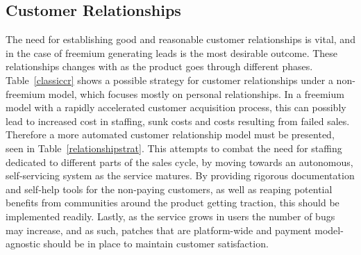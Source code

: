 \subsection{Customer Relationships}
The need for establishing good and reasonable customer relationships is vital, and in the case of freemium generating leads is the most desirable outcome. These relationships changes with as the product goes through different phases. Table~\ref{classiccr} shows a possible strategy for customer relationships under a non-freemium model, which focuses mostly on personal relationships. In a freemium model with a rapidly accelerated customer acquisition process, this can possibly lead to increased cost in staffing, sunk costs and costs resulting from failed sales. Therefore a more automated customer relationship model must be presented, seen in Table~\ref{relationshipstrat}. This attempts to combat the need for staffing dedicated to different parts of the sales cycle, by moving towards an autonomous, self-servicing system as the service matures. By providing rigorous documentation and self-help tools for the non-paying customers, as well as reaping potential benefits from communities around the product getting traction, this should be implemented readily. Lastly, as the service grows in users the number of bugs may increase, and as such, patches that are platform-wide and payment model-agnostic should be in place to maintain customer satisfaction.

\begin{table}[]
\centering
\caption{Customer relationships for different product phases, classic model~\cite{karlbernhoffbinde2015}}
\label{classiccr}
\end{table}

